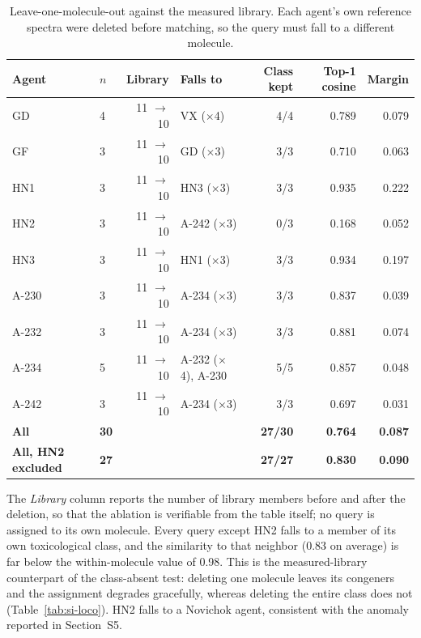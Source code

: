 \begin{table}[htbp]
\centering
\caption{Leave-one-molecule-out against the measured library. Each agent's own reference spectra were deleted before matching, so the query must fall to a different molecule.}
\label{tab:si-loo}
\small
\begin{tabular}{llrp{3.6cm}rrr}
\toprule
Agent & $n$ & Library & Falls to & Class kept & Top-1 cosine & Margin \\
\midrule
GD & 4 & 11 $\rightarrow$ 10 & VX ($\times$4) & 4/4 & 0.789 & 0.079 \\
GF & 3 & 11 $\rightarrow$ 10 & GD ($\times$3) & 3/3 & 0.710 & 0.063 \\
HN1 & 3 & 11 $\rightarrow$ 10 & HN3 ($\times$3) & 3/3 & 0.935 & 0.222 \\
HN2 & 3 & 11 $\rightarrow$ 10 & A-242 ($\times$3) & 0/3 & 0.168 & 0.052 \\
HN3 & 3 & 11 $\rightarrow$ 10 & HN1 ($\times$3) & 3/3 & 0.934 & 0.197 \\
A-230 & 3 & 11 $\rightarrow$ 10 & A-234 ($\times$3) & 3/3 & 0.837 & 0.039 \\
A-232 & 3 & 11 $\rightarrow$ 10 & A-234 ($\times$3) & 3/3 & 0.881 & 0.074 \\
A-234 & 5 & 11 $\rightarrow$ 10 & A-232 ($\times$4), A-230 & 5/5 & 0.857 & 0.048 \\
A-242 & 3 & 11 $\rightarrow$ 10 & A-234 ($\times$3) & 3/3 & 0.697 & 0.031 \\
\textbf{All} & \textbf{30} &  &  & \textbf{27/30} & \textbf{0.764} & \textbf{0.087} \\
\textbf{All, HN2 excluded} & \textbf{27} &  &  & \textbf{27/27} & \textbf{0.830} & \textbf{0.090} \\
\bottomrule
\end{tabular}

\begin{flushleft}\footnotesize The \emph{Library} column reports the number of library members before and after the deletion, so that the ablation is verifiable from the table itself; no query is assigned to its own molecule. Every query except HN2 falls to a member of its own toxicological class, and the similarity to that neighbor (0.83 on average) is far below the within-molecule value of 0.98. This is the measured-library counterpart of the class-absent test: deleting one molecule leaves its congeners and the assignment degrades gracefully, whereas deleting the entire class does not (Table~\ref{tab:si-loco}). HN2 falls to a Novichok agent, consistent with the anomaly reported in Section~S5.\end{flushleft}
\end{table}
